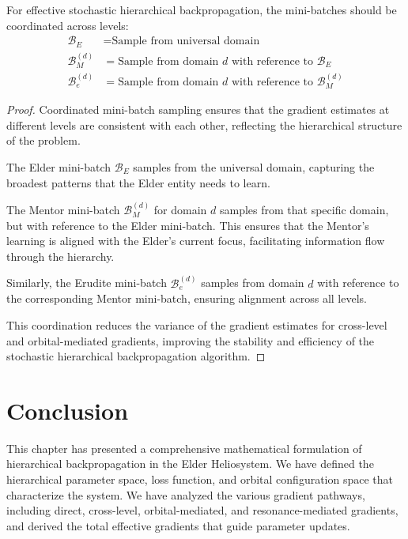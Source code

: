 \begin{theorem}
For effective stochastic hierarchical backpropagation, the mini-batches should be coordinated across levels:
\begin{align}
\mathcal{B}_E &= \text{Sample from universal domain} \\
\mathcal{B}_M^{(d)} &= \text{Sample from domain } d \text{ with reference to } \mathcal{B}_E \\
\mathcal{B}_e^{(d)} &= \text{Sample from domain } d \text{ with reference to } \mathcal{B}_M^{(d)}
\end{align}
\end{theorem}

\begin{proof}
Coordinated mini-batch sampling ensures that the gradient estimates at different levels are consistent with each other, reflecting the hierarchical structure of the problem.

The Elder mini-batch $\mathcal{B}_E$ samples from the universal domain, capturing the broadest patterns that the Elder entity needs to learn.

The Mentor mini-batch $\mathcal{B}_M^{(d)}$ for domain $d$ samples from that specific domain, but with reference to the Elder mini-batch. This ensures that the Mentor's learning is aligned with the Elder's current focus, facilitating information flow through the hierarchy.

Similarly, the Erudite mini-batch $\mathcal{B}_e^{(d)}$ samples from domain $d$ with reference to the corresponding Mentor mini-batch, ensuring alignment across all levels.

This coordination reduces the variance of the gradient estimates for cross-level and orbital-mediated gradients, improving the stability and efficiency of the stochastic hierarchical backpropagation algorithm.
\end{proof}

\section{Conclusion}

This chapter has presented a comprehensive mathematical formulation of hierarchical backpropagation in the Elder Heliosystem. We have defined the hierarchical parameter space, loss function, and orbital configuration space that characterize the system. We have analyzed the various gradient pathways, including direct, cross-level, orbital-mediated, and resonance-mediated gradients, and derived the total effective gradients that guide parameter updates.


